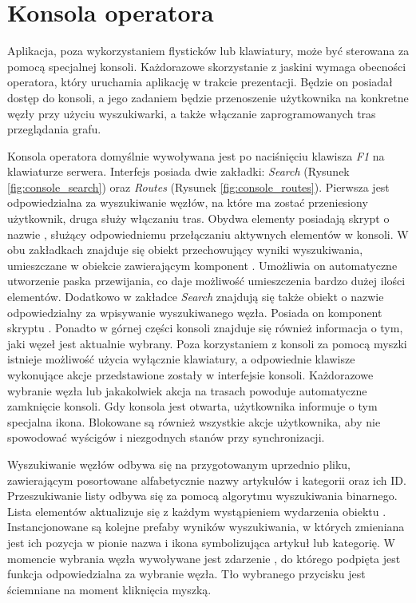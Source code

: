\section{Konsola operatora}
\label{sec:konsola_operatora}
Aplikacja, poza wykorzystaniem flysticków lub klawiatury, może być sterowana za pomocą specjalnej konsoli. Każdorazowe skorzystanie z jaskini wymaga obecności operatora, który uruchamia aplikację w trakcie prezentacji. Będzie on posiadał dostęp do konsoli, a jego zadaniem będzie przenoszenie użytkownika na konkretne węzły przy użyciu wyszukiwarki, a także włączanie zaprogramowanych tras przeglądania grafu. 

Konsola operatora domyślnie wywoływana jest po naciśnięciu klawisza \textit{F1} na klawiaturze serwera. Interfejs posiada dwie zakładki: \textit{Search} (Rysunek \ref{fig:console_search}) oraz \textit{Routes} (Rysunek \ref{fig:console_routes}). Pierwsza jest odpowiedzialna za wyszukiwanie węzłów, na które ma zostać przeniesiony użytkownik, druga służy włączaniu tras. Obydwa elementy posiadają skrypt o nazwie , służący odpowiedniemu przełączaniu aktywnych elementów w konsoli. W obu zakładkach znajduje się obiekt przechowujący wyniki wyszukiwania, umieszczane w obiekcie zawierającym komponent . Umożliwia on automatyczne utworzenie paska przewijania, co daje możliwość umieszczenia bardzo dużej ilości elementów. Dodatkowo w zakładce \textit{Search} znajdują się także obiekt o nazwie  odpowiedzialny za wpisywanie wyszukiwanego węzła. Posiada on komponent skryptu . Ponadto w górnej części konsoli znajduje się również informacja o tym, jaki węzeł jest aktualnie wybrany. Poza korzystaniem z konsoli za pomocą myszki istnieje możliwość użycia wyłącznie klawiatury, a odpowiednie klawisze wykonujące akcje przedstawione zostały w interfejsie konsoli. Każdorazowe wybranie węzła lub jakakolwiek akcja na trasach powoduje automatyczne zamknięcie konsoli. Gdy konsola jest otwarta, użytkownika informuje o tym specjalna ikona. Blokowane są również wszystkie akcje użytkownika, aby nie spowodować wyścigów i niezgodnych stanów przy synchronizacji.


Wyszukiwanie węzłów odbywa się na przygotowanym uprzednio pliku, zawierającym posortowane alfabetycznie nazwy artykułów i kategorii oraz ich ID. Przeszukiwanie listy odbywa się za pomocą algorytmu wyszukiwania binarnego. Lista elementów aktualizuje się z każdym wystąpieniem wydarzenia  obiektu . Instancjonowane są kolejne prefaby wyników wyszukiwania, w których zmieniana jest ich pozycja w pionie nazwa i ikona symbolizująca artykuł lub kategorię. W momencie wybrania węzła wywoływane jest zdarzenie , do którego podpięta jest funkcja  odpowiedzialna za wybranie węzła. Tło wybranego przycisku jest ściemniane na moment kliknięcia myszką.

